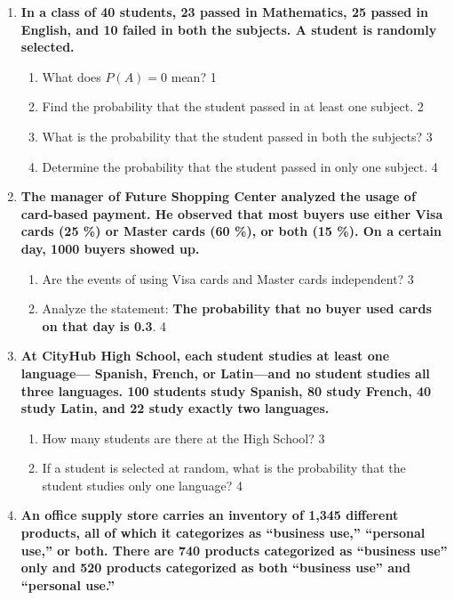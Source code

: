 \documentclass[a4paper,oneside, margin=1.4in]{book}
\begin{document}
\begin{enumerate}
  
   \item
  \textbf{In a class of 40 students, 23 passed in Mathematics, 25 passed in English, and 10 failed in both the subjects. A student is randomly selected.}

  \begin{enumerate}
    \item
	What does $P(A) = 0$ mean? \hfill 1
    \item
	Find the probability that the student passed in at least one subject. \hfill 2
    \item  
	What is the probability that the student passed in both the subjects? \hfill 3
    \item
	Determine the probability that the student passed in only one subject. \hfill 4
  \end{enumerate} 
  
   \item
	  \textbf{The manager of Future Shopping Center analyzed the usage of card-based payment. He observed that most buyers use either Visa cards (25 \%) or Master cards (60 \%), or both (15 \%). On a certain day, 1000 buyers showed up.} 
  
  \begin{enumerate}
    \item  
	Are the events of using Visa cards and Master cards independent? \hfill 3
    \item
	Analyze the statement: \textbf{The probability that no buyer used cards on that day is 0.3}. \hfill 4
  \end{enumerate}
  
   \item
	  \textbf{At CityHub High School, each student studies at least one language— Spanish, French, or Latin—and no student studies all three languages. 100 students study Spanish, 80 study French, 40 study Latin, and 22 study exactly two languages.} 
  
  \begin{enumerate}
    \item  
	How many students are there at the High School? \hfill 3
    \item
	If a student is selected at random, what is the probability that the student studies only one language? \hfill 4
  \end{enumerate}

 \item
	  \textbf{An office supply store carries an inventory of 1,345 different products, all of which it categorizes as “business use,” “personal use,” or both. There are 740 products categorized as “business use” only and 520 products categorized as both “business use” and “personal use.”} 
  

\end{enumerate}
\end{document}
